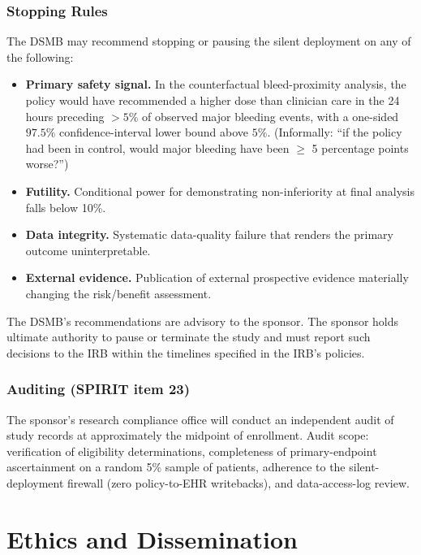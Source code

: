 \documentclass[11pt]{article}
\begin{document}
\subsubsection{Stopping Rules}

The DSMB may recommend stopping or pausing the silent deployment on any of the following:
\begin{itemize}
  \item \textbf{Primary safety signal.} In the counterfactual bleed-proximity analysis, the policy would have recommended a higher dose than clinician care in the 24 hours preceding $>5\%$ of observed major bleeding events, with a one-sided $97.5\%$ confidence-interval lower bound above $5\%$. (Informally: ``if the policy had been in control, would major bleeding have been $\geq$ 5 percentage points worse?'')
  \item \textbf{Futility.} Conditional power for demonstrating non-inferiority at final analysis falls below 10\%.
  \item \textbf{Data integrity.} Systematic data-quality failure that renders the primary outcome uninterpretable.
  \item \textbf{External evidence.} Publication of external prospective evidence materially changing the risk/benefit assessment.
\end{itemize}

The DSMB's recommendations are advisory to the sponsor. The sponsor holds ultimate authority to pause or terminate the study and must report such decisions to the IRB within the timelines specified in the IRB's policies.

\subsubsection{Auditing (SPIRIT item 23)}

The sponsor's research compliance office will conduct an independent audit of study records at approximately the midpoint of enrollment. Audit scope: verification of eligibility determinations, completeness of primary-endpoint ascertainment on a random 5\% sample of patients, adherence to the silent-deployment firewall (zero policy-to-EHR writebacks), and data-access-log review.

\section{Ethics and Dissemination}
\label{sec:ethics}
\end{document}
